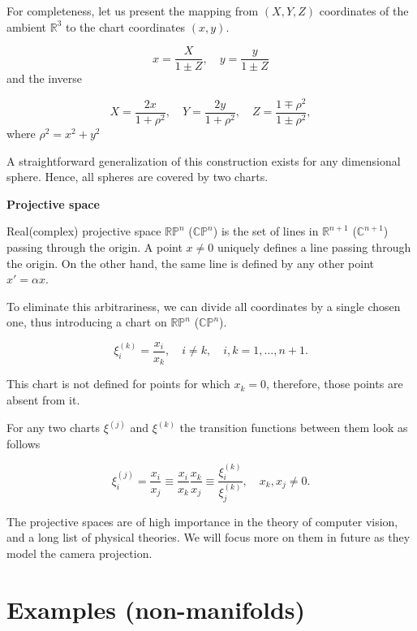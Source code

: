 \documentclass[a4paper,10pt]{article}
\begin{document}
For completeness, let us present the mapping from $(X,Y,Z)$ coordinates of the ambient $\mathbb{R}^3$ to the chart coordinates $(x,y)$.

\begin{equation}
 x = \frac{X}{1\pm Z},\quad y = \frac{y}{1\pm Z}
\end{equation}
and the inverse 

\begin{equation}
 X = \frac{2x}{1+\rho^2},\quad Y = \frac{2y}{1+\rho^2}, \quad Z = \frac{1\mp\rho^2}{1\pm\rho^2}, 
\end{equation}
where $\rho^2 = x^2 + y^2$

A straightforward generalization of this construction exists for any dimensional sphere. Hence, all spheres are covered by two charts.
\newline

{\bf Projective space }
\newline

Real(complex) projective space $\mathbb{RP}^n$ ($\mathbb{CP}^n$) is the set of lines in $\mathbb{R}^{n+1}$ ($\mathbb{C}^{n+1}$) passing through the origin. A point $x \neq 0$ uniquely defines a line passing through the origin. On the other hand, the same line is defined by any other point $x' = \alpha x$. 

To eliminate this arbitrariness, we can divide all coordinates by a single chosen one, thus introducing a chart on $\mathbb{RP}^n$ ($\mathbb{CP}^n$).

\begin{equation}
\xi^{(k)}_i = \frac{x_i}{x_k},  \quad i\neq k, \quad i,k = 1, \ldots, n+1.
\end{equation}

This chart is not defined for points for which $x_k = 0$, therefore, those points are absent from it. 

For any two charts $\xi^{(j)}$ and $\xi^{(k)}$ the transition functions between them look as follows

\begin{equation}
 \xi^{(j)}_i = \frac{x_i}{x_j} \equiv \frac{x_i}{x_k}\frac{x_k}{x_j} \equiv \frac{\xi^{(k)}_i}{\xi^{(k)}_j}, \quad x_k, x_j\neq 0.
\end{equation}

The projective spaces are of high importance in the theory of computer vision, and a long list of physical theories. We will focus more on them in future as they model the camera projection. 


\newpage
\section{Examples (non-manifolds)}
\end{document}
